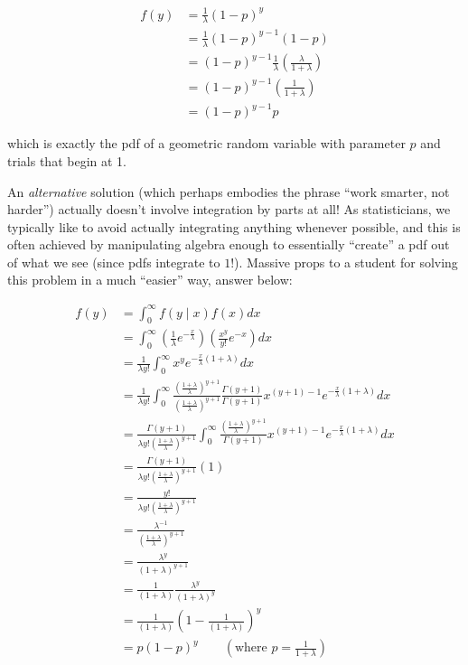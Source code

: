 \documentclass[
  letterpaper,
  DIV=11,
  numbers=noendperiod]{scrreprt}
\begin{document}
\begin{align*}
    f(y) & = \frac{1}{\lambda} (1 - p)^y \\
    & = \frac{1}{\lambda} (1 - p)^{y-1} (1-p) \\
    & = (1 - p)^{y-1} \frac{1}{\lambda} \left( \frac{\lambda}{1 + \lambda} \right) \\
    & = (1 - p)^{y-1} \left( \frac{1}{1 + \lambda} \right) \\
    & = (1 - p)^{y-1} p
\end{align*}

which is exactly the pdf of a geometric random variable with parameter
\(p\) and trials that begin at 1.

An \emph{alternative} solution (which perhaps embodies the phrase ``work
smarter, not harder'') actually doesn't involve integration by parts at
all! As statisticians, we typically like to avoid actually integrating
anything whenever possible, and this is often achieved by manipulating
algebra enough to essentially ``create'' a pdf out of what we see (since
pdfs integrate to \(1\)!). Massive props to a student for solving this
problem in a much ``easier'' way, answer below:

\begin{align*}
        f(y) &= \int_{0}^{\infty} f(y \mid x) f(x) dx \\
        &= \int_{0}^{\infty} (\frac{1}{\lambda}e^{-\frac{x}{\lambda}}) (\frac{x^y}{y!} e^{-x}) dx \\
        &= \frac{1}{\lambda y!} \int_{0}^{\infty} x^y e^{-\frac{x}{\lambda}(1 + \lambda)} dx \\
        &= \frac{1}{\lambda y!} \int_{0}^{\infty} \frac{(\frac{1+\lambda}{\lambda})^{y+1}}{(\frac{1+\lambda}{\lambda})^{y+1}} \frac{\Gamma(y+1)}{\Gamma(y+1)} x^{(y+1)-1} e^{-\frac{x}{\lambda}(1 + \lambda)} dx\\
        &= \frac{\Gamma(y+1)}{\lambda y! (\frac{1+\lambda}{\lambda})^{y+1}} \int_{0}^{\infty} \frac{(\frac{1+\lambda}{\lambda})^{y+1}}{\Gamma(y+1)} x^{(y+1)-1} e^{-\frac{x}{\lambda}(1 + \lambda)} dx\\
        &= \frac{\Gamma(y+1)}{\lambda y! (\frac{1+\lambda}{\lambda})^{y+1}} (1)\\
        &= \frac{y!}{\lambda y! (\frac{1+\lambda}{\lambda})^{y+1}} \\
        &= \frac{\lambda^{-1}}{(\frac{1+\lambda}{\lambda})^{y+1}}\\
        &= \frac{\lambda^y}{(1+\lambda)^{y+1}}\\
        &= \frac{1}{(1+\lambda)} \frac{\lambda^y}{(1+\lambda)^y}\\
        &= \frac{1}{(1+\lambda)} (1 - \frac{1}{(1+\lambda)})^y \\
        &=p(1-p)^y\qquad (\text{where }p=\frac{1}{1+\lambda})
    \end{align*}
\end{document}
